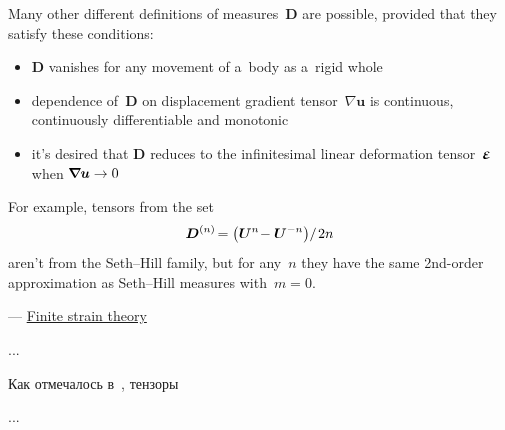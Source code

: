 Many other different definitions of measures~$\bm{D}$ are possible, provided that they satisfy these conditions:

\begin{itemize}
\item $\bm{D}$ vanishes for any movement of a~body as a~rigid whole
\item dependence of~$\bm{D}$ on displacement gradient tensor~${\nabla \bm{u}}$ is continuous, continuously differentiable and monotonic
\item it’s desired that $\bm{D}$ reduces to the infinitesimal linear deformation tensor~${\infinitesimaldeformation}$ when ${\bm{\nabla}\hspace{-0.2ex} \bm{u} \to 0}$
\end{itemize}

\noindent For example, tensors from the set
\[ \displaystyle \bm{D}^{(n)} \hspace{-0.32ex} = \left( {\bm{U}}^{n} \hspace{-0.4ex} - {\bm{U}}^{-n} \right) \hspace{-0.4ex} / \hspace{.25ex} 2n \]
aren’t from the Seth\hbox{--}Hill family, but for any~$n$ they have the same 2nd\hbox{-}order approximation as Seth\hbox{--}Hill measures with~${m=0}$.

\vspace{.4em} \noindent \hfill {}\:--- \href{https://en.wikipedia.org/wiki/Finite_strain_theory}{Finite strain theory}

\vspace{1cm}

\begin{otherlanguage}{russian}

...

Как отмечалось в~, тензоры


...



\end{otherlanguage}



